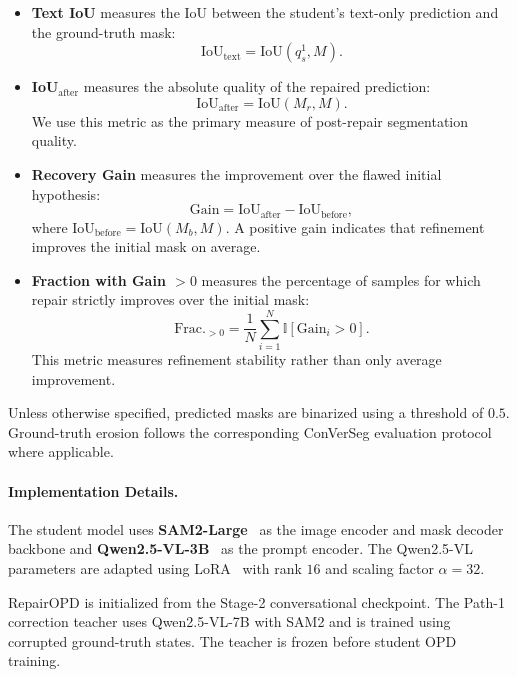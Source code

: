 \begin{itemize}
    \item \textbf{Text IoU} measures the IoU between the student's text-only prediction and the ground-truth mask:
    \[
    \mathrm{IoU}_{\mathrm{text}}
    =
    \mathrm{IoU}(q_s^{1},M).
    \]

    \item \textbf{IoU$_{\mathrm{after}}$} measures the absolute quality of the repaired prediction:
    \[
    \mathrm{IoU}_{\mathrm{after}}
    =
    \mathrm{IoU}(M_r,M).
    \]
    We use this metric as the primary measure of post-repair segmentation quality.

    \item \textbf{Recovery Gain} measures the improvement over the flawed initial hypothesis:
    \[
    \mathrm{Gain}
    =
    \mathrm{IoU}_{\mathrm{after}}
    -
    \mathrm{IoU}_{\mathrm{before}},
    \]
    where
    $\mathrm{IoU}_{\mathrm{before}}
    =
    \mathrm{IoU}(M_b,M)$.
    A positive gain indicates that refinement improves the initial mask on average.

    \item \textbf{Fraction with Gain $>0$} measures the percentage of samples for which repair strictly improves over the initial mask:
    \[
    \mathrm{Frac.}_{>0}
    =
    \frac{1}{N}
    \sum_{i=1}^{N}
    \mathbb{I}
    \left[
    \mathrm{Gain}_i>0
    \right].
    \]
    This metric measures refinement stability rather than only average improvement.
\end{itemize}

Unless otherwise specified, predicted masks are binarized using a threshold of $0.5$.
Ground-truth erosion follows the corresponding ConVerSeg evaluation protocol where applicable.


\paragraph{Implementation Details.}
The student model uses \textbf{SAM2-Large}~\cite{ravi2024sam2} as the image encoder and mask decoder backbone and \textbf{Qwen2.5-VL-3B}~\cite{qwen25vl} as the prompt encoder.
The Qwen2.5-VL parameters are adapted using LoRA~\cite{hu2022lora} with rank $16$ and scaling factor $\alpha=32$.

RepairOPD is initialized from the Stage-2 conversational checkpoint.
The Path-1 correction teacher uses Qwen2.5-VL-7B with SAM2 and is trained using corrupted ground-truth states.
The teacher is frozen before student OPD training.

